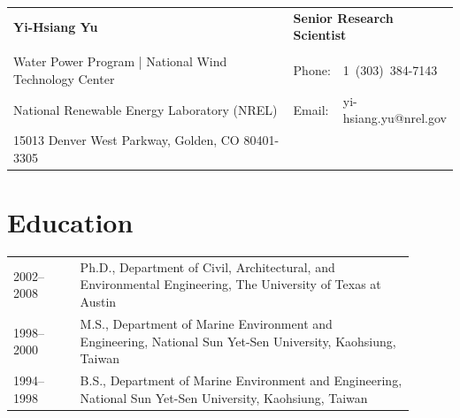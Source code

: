 \documentclass[10pt]{article}
\begin{document}
\begin{table}[H]
{\def\arraystretch{1}\tabcolsep=0pt
\begin{tabular}{p{0.72\linewidth}p{0.08\linewidth}p{0.2\linewidth}}
  \multirow{1}{*}{\LARGE \textbf{Yi-Hsiang Yu}}         & \multicolumn{2}{l}{\textbf{Senior Research Scientist}} \\
                                                        &        &  \\
  Water Power Program | National Wind Technology Center & Phone: & {1~(303)~384-7143} \\
  National Renewable Energy Laboratory (NREL)           & Email: & {yi-hsiang.yu@nrel.gov} \\
  15013 Denver West Parkway, Golden, CO 80401-3305      &        &  \\
\end{tabular}%
} \end{table}

\section*{Education}\label{education}
\begin{table}[H]
{\def\arraystretch{1}\tabcolsep=0pt
\vspace*{-\baselineskip}
\begin{tabular}{p{0.15\linewidth}p{0.75\linewidth}}
  2002--2008 & Ph.D., Department of Civil, Architectural, and Environmental Engineering, The University of Texas at Austin \\
  1998--2000 & M.S., Department of Marine Environment and Engineering, National Sun Yet-Sen University, Kaohsiung, Taiwan \\
  1994--1998 & B.S., Department of Marine Environment and Engineering, National Sun Yet-Sen University, Kaohsiung, Taiwan \\
\end{tabular}%
} \end{table}
\end{document}
